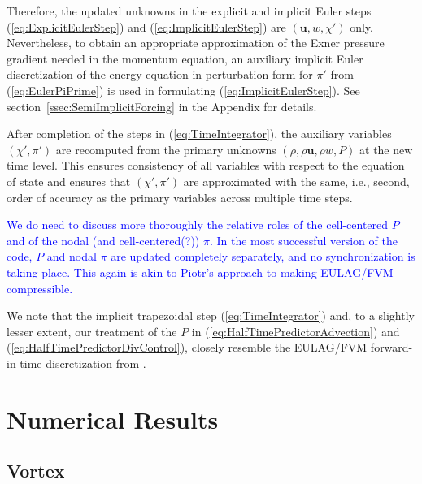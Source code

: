 \documentclass{ametsoc}
\theoremstyle{definition}
\newcommand{\klein}[1]{\textcolor{blue}{#1}}
\newcommand{\eq}[1]{(\ref{#1})}
\newcommand{\vect}[1]{{\mathbf{#1}}}
\newcommand{\vu}{\vect{u}}
\newcommand{\chiprime}{{\chi'}}
\newcommand{\piprime}{\pi'}
\begin{document}
Therefore, the updated unknowns in the explicit and 
implicit Euler steps \eq{eq:ExplicitEulerStep} and \eq{eq:ImplicitEulerStep} 
are $(\vu, w, \chiprime)$ only. Nevertheless, to obtain 
an appropriate approximation of the Exner pressure gradient needed in the 
momentum equation, an auxiliary implicit Euler discretization of the energy 
equation in perturbation form for $\piprime$ from \eq{eq:EulerPiPrime} is 
used in formulating \eq{eq:ImplicitEulerStep}. See 
section~\ref{ssec:SemiImplicitForcing} in the Appendix for details. 

After completion of the steps in \eq{eq:TimeIntegrator}, the auxiliary variables $(\chiprime, \pi')$ are recomputed from the primary
unknowns $(\rho, \rho\vu, \rho w, P)$ at the new time level. This ensures
consistency of all variables with respect to the equation of state and
ensures that $(\chiprime, \pi')$ are approximated with the same, i.e., 
second, order of accuracy as the primary variables across multiple time 
steps. 

\klein{We do need to discuss more thoroughly the relative roles of the cell-centered $P$ and of the nodal (and cell-centered(?)) $\pi$. In the most successful version of the code, $P$ and nodal $\pi$ are updated completely separately, and no synchronization is taking place. This again is akin to Piotr's approach to making EULAG/FVM compressible.}

We note that the implicit trapezoidal step \eq{eq:TimeIntegrator} and, to a slightly lesser extent, our treatment of the $P$ in \eq{eq:HalfTimePredictorAdvection} and \eq{eq:HalfTimePredictorDivControl}, closely resemble the EULAG/FVM forward-in-time discretization from \citep{PrusaEtAl2008,SmolarkiewiczEtAl2014, SmolarkiewiczEtAl2016, KuehnleinEtAl2018}.




\section{Numerical Results}
\label{sec:Results}

\subsection{Vortex}
\end{document}
